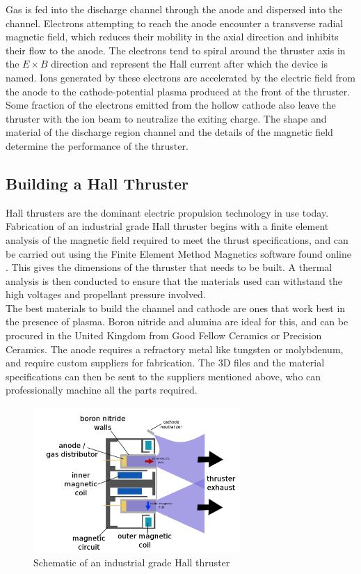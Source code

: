 \documentclass[11pt]{article}
\begin{document}
Gas is fed into the discharge channel through the anode and dispersed into the channel. Electrons attempting to reach the anode encounter a transverse radial magnetic field, which reduces their mobility in the axial direction and inhibits their flow to the anode. The electrons tend to spiral around the thruster axis in the $E \times B$ direction and represent the Hall current after which the device is named. Ions generated by these electrons are accelerated by the electric field from the anode to the cathode-potential plasma produced at the front of the thruster. Some fraction of the electrons emitted from the hollow cathode also leave the thruster with the ion beam to neutralize the exiting charge. The shape and material of the discharge region channel and the details of the magnetic field determine the performance of the thruster.

\subsection{Building a Hall Thruster}

Hall thrusters are the dominant electric propulsion technology in use today. Fabrication of an industrial grade Hall thruster begins with a finite element analysis of the magnetic field required to meet the thrust specifications, and can be carried out using the Finite Element Method Magnetics software found online \cite{femm}. This gives the dimensions of the thruster that needs to be built. A thermal analysis is then conducted to ensure that the materials used can withstand the high voltages and propellant pressure involved.\\

The best materials to build the channel and cathode are ones that work best in the presence of plasma. Boron nitride and alumina are ideal for this, and can be procured in the United Kingdom from Good Fellow Ceramics or Precision Ceramics. The anode requires a refractory metal like tungsten or molybdenum, and require custom suppliers for fabrication. The 3D files and the material specifications can then be sent to the suppliers mentioned above, who can professionally machine all the parts required.\\

\begin{figure}[h!]
\centering
\includegraphics[width= 0.7\textwidth]{hall_industrial}
\caption{\label{fig:hall_industrial} Schematic of an industrial grade Hall thruster}
\end{figure}
\end{document}
